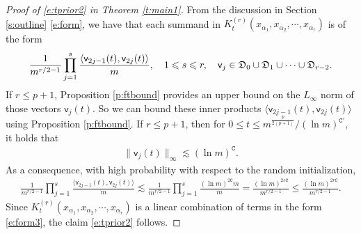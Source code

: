 \documentclass{article}
\numberwithin{equation}{section}
\newcommand{\fC}{{\mathtt C}}
\newcommand{\fD}{{\frak D}}
\newcommand{\sfv}{{\mathsf v}}
\newcommand{\al}{\alpha}
\renewcommand{\leq}{\leqslant}
\newcommand{\1}{\mathds{1}}
\theoremstyle{plain} %
\begin{document}
\begin{proof}[Proof of \eqref{e:tprior2} in Theorem \ref{t:main1}]
From the discussion in Section \ref{s:outline} \eqref{e:form}, we have that each summand in $K_t^{(r)}(x_{\al_1}, x_{\al_2},\cdots, x_{\al_r})$ is of the form
\begin{align}\label{e:form3}
\frac{1}{m^{r/2-1}}\prod_{j=1}^s \frac{\langle \sfv_{2j-1}(t),\sfv_{2j}(t)\rangle}{m}, \quad 1\leq s\leq r,\quad \sfv_{j}\in \fD_0\cup \fD_1\cup \cdots \cup \fD_{r-2}.
\end{align}
If $r\leq p+1$, Proposition \ref{p:ftbound} provides an upper bound on the $L_\infty$ norm of those vectors $\sfv_j(t)$. So we can bound these inner products $\langle \sfv_{2j-1}(t),\sfv_{2j}(t) \rangle$ using Proposition \ref{p:ftbound}. If $r\leq p+1$, then for $0\leq t\leq m^{\frac{p}{2(p+1)}}/(\ln m)^{\fC'}$, it holds that 
\begin{align*}
\|\sfv_j(t)\|_\infty\lesssim (\ln m)^\fC.
\end{align*}
As a consequence, with high probability with respect to the random initialization, 
\begin{align*}
\frac{1}{m^{r/2-1}}\prod_{j=1}^s \frac{\langle \sfv_{2j-1}(t),\sfv_{2j}(t)\rangle}{m}
\lesssim 
\frac{1}{m^{r/2-1}}\prod_{j=1}^s \frac{(\ln m)^{2\fC}m}{m}
=\frac{(\ln m)^{2s\fC}}{m^{r/2-1}}\leq \frac{(\ln m)^{2r\fC}}{m^{r/2-1}}.
\end{align*}
Since $K_t^{(r)}(x_{\al_1}, x_{\al_2},\cdots, x_{\al_r})$ is a linear combination of terms in the form \eqref{e:form3}, the claim \eqref{e:tprior2} follows.
\end{proof}
\end{document}
